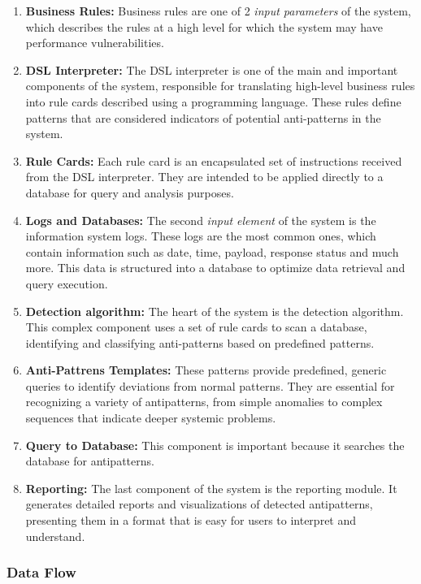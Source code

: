 \documentclass[12pt, times]{article}
\begin{document}
	\begin{enumerate}
		\item  \textbf{Business Rules:} Business rules \cite{business_rules} are one of 2 \textit{input parameters} of the system, which describes the rules at a high level for which the system may have performance vulnerabilities.
		\item \textbf{DSL Interpreter:} The DSL interpreter is one of the main and important components of the system, responsible for translating high-level business rules into rule cards described using a programming language. These rules define patterns that are considered indicators of potential anti-patterns in the system.
		\item  \textbf{Rule Cards:} Each rule card is an encapsulated set of instructions received from the DSL interpreter. They are intended to be applied directly to a database for query and analysis purposes.
		\item  \textbf{Logs and Databases:} The second \textit{input element} of the system is the information system logs. These logs are the most common ones, which contain information such as date, time, payload, response status and much more. This data is structured into a database to optimize data retrieval and query execution.
		\item  \textbf{Detection algorithm: }The heart of the system is the detection algorithm. This complex component uses a set of rule cards to scan a database, identifying and classifying anti-patterns based on predefined patterns.
		\item  \textbf{Anti-Pattrens Templates: }These patterns provide predefined, generic queries to identify deviations from normal patterns. They are essential for recognizing a variety of antipatterns, from simple anomalies to complex sequences that indicate deeper systemic problems.
		\item  \textbf{Query to Database: }This component is important because it searches the database for antipatterns.
		\item  \textbf{Reporting: }The last component of the system is the reporting module. It generates detailed reports and visualizations of detected antipatterns, presenting them in a format that is easy for users to interpret and understand.
	\end{enumerate}
	
	\subsubsection*{Data Flow}
	
\end{document}
